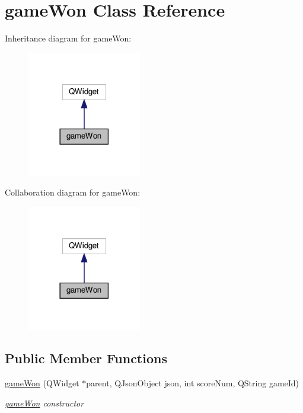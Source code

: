 \hypertarget{classgameWon}{}\section{game\+Won Class Reference}
\label{classgameWon}


Inheritance diagram for game\+Won\+:
\nopagebreak
\begin{figure}[H]
\begin{center}
\leavevmode
\includegraphics[width=141pt]{classgameWon__inherit__graph}
\end{center}
\end{figure}


Collaboration diagram for game\+Won\+:
\nopagebreak
\begin{figure}[H]
\begin{center}
\leavevmode
\includegraphics[width=141pt]{classgameWon__coll__graph}
\end{center}
\end{figure}
\subsection*{Public Member Functions}
\begin{DoxyCompactItemize}
\item 
\hyperlink{classgameWon_aa80eab42913e798314f5d3ab9305eeb8}{game\+Won} (Q\+Widget $\ast$parent, Q\+Json\+Object json, int score\+Num, Q\+String game\+Id)
\begin{DoxyCompactList}\small\item\em \hyperlink{classgameWon}{game\+Won} constructor \end{DoxyCompactList}\end{DoxyCompactItemize}


